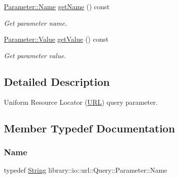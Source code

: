 \begin{DoxyCompactItemize}
\hyperlink{classlibrary_1_1io_1_1url_1_1_query_1_1_parameter_a7edf5fb8a4ae57aed1ce5dfa2405c981}{Parameter\+::\+Name} \hyperlink{classlibrary_1_1io_1_1url_1_1_query_1_1_parameter_ad9aa95486e02d12654d69e6b877a1c57}{get\+Name} () const
\begin{DoxyCompactList}\small\item\em Get parameter name. \end{DoxyCompactList}\item 
\hyperlink{classlibrary_1_1io_1_1url_1_1_query_1_1_parameter_a46e7a7b97d44f51f83d6261f70ba0a5e}{Parameter\+::\+Value} \hyperlink{classlibrary_1_1io_1_1url_1_1_query_1_1_parameter_ad626a3718f1619b5d3d594f11fa57a52}{get\+Value} () const
\begin{DoxyCompactList}\small\item\em Get parameter value. \end{DoxyCompactList}\end{DoxyCompactItemize}


\subsection{Detailed Description}
Uniform Resource Locator (\hyperlink{classlibrary_1_1io_1_1_u_r_l}{U\+RL}) query parameter. 

\subsection{Member Typedef Documentation}
\mbox{\label{classlibrary_1_1io_1_1url_1_1_query_1_1_parameter_a7edf5fb8a4ae57aed1ce5dfa2405c981}} 
\subsubsection{\texorpdfstring{Name}{Name}}
{\footnotesize\ttfamily typedef \hyperlink{namespacelibrary_1_1io_a7469b45835a4421045db344d6a5a1f85}{String} library\+::io\+::url\+::\+Query\+::\+Parameter\+::\+Name}

\mbox{\label{classlibrary_1_1io_1_1url_1_1_query_1_1_parameter_a46e7a7b97d44f51f83d6261f70ba0a5e}} 
